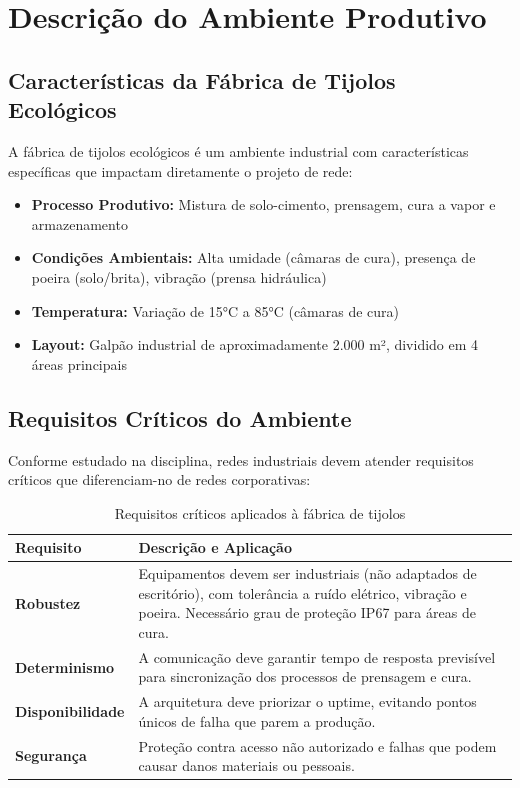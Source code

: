 \documentclass[12pt,a4paper]{article}
\begin{document}
\section{Descrição do Ambiente Produtivo}

\subsection{Características da Fábrica de Tijolos Ecológicos}

A fábrica de tijolos ecológicos é um ambiente industrial com características específicas que impactam diretamente o projeto de rede:

\begin{itemize}
    \item \textbf{Processo Produtivo:} Mistura de solo-cimento, prensagem, cura a vapor e armazenamento
    \item \textbf{Condições Ambientais:} Alta umidade (câmaras de cura), presença de poeira (solo/brita), vibração (prensa hidráulica)
    \item \textbf{Temperatura:} Variação de 15°C a 85°C (câmaras de cura)
    \item \textbf{Layout:} Galpão industrial de aproximadamente 2.000 m², dividido em 4 áreas principais
\end{itemize}

\subsection{Requisitos Críticos do Ambiente}

Conforme estudado na disciplina, redes industriais devem atender requisitos críticos que diferenciam-no de redes corporativas:

\begin{table}[h]
\centering
\begin{tabular}{@{}p{4cm}|p{10cm}@{}}
\toprule
\textbf{Requisito} & \textbf{Descrição e Aplicação} \\
\midrule
\textbf{Robustez} & Equipamentos devem ser industriais (não adaptados de escritório), com tolerância a ruído elétrico, vibração e poeira. Necessário grau de proteção IP67 para áreas de cura. \\
\midrule
\textbf{Determinismo} & A comunicação deve garantir tempo de resposta previsível para sincronização dos processos de prensagem e cura. \\
\midrule
\textbf{Disponibilidade} & A arquitetura deve priorizar o uptime, evitando pontos únicos de falha que parem a produção. \\
\midrule
\textbf{Segurança} & Proteção contra acesso não autorizado e falhas que podem causar danos materiais ou pessoais. \\
\bottomrule
\end{tabular}
\caption{Requisitos críticos aplicados à fábrica de tijolos}
\end{table}
\end{document}
